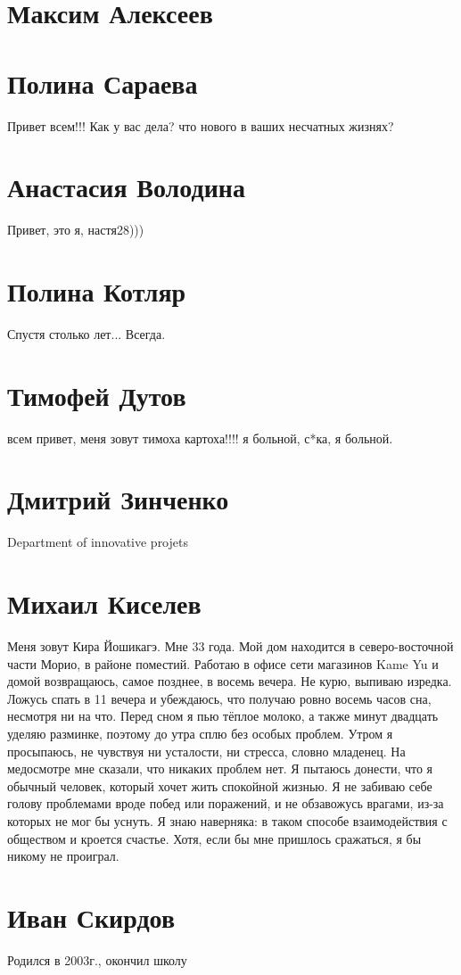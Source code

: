 \documentclass[labwork]{fefudoc}
\begin{document}
\section{Максим Алексеев}
\section{Полина Сараева}

Привет всем!!! Как у вас дела? что нового в ваших несчатных жизнях?

\section{Анастасия Володина}
Привет, это я, настя28))) 
\section{Полина Котляр}

Спустя столько лет...
Всегда.

\section{Тимофей Дутов}

всем привет, меня зовут тимоха картоха!!!!
я больной, с*ка, я больной.


\section{Дмитрий Зинченко}
Department of innovative projets
\section{Михаил Киселев}
Меня зовут Кира Йошикагэ. Мне 33 года. Мой дом находится в северо-восточной части Морио, в районе поместий. Работаю в офисе сети магазинов Kame Yu и домой возвращаюсь, самое позднее, в восемь вечера.
Не курю, выпиваю изредка. Ложусь спать в 11 вечера и убеждаюсь, что получаю ровно восемь часов сна, несмотря ни на что. Перед сном я пью тёплое молоко, а также минут двадцать уделяю разминке, поэтому до утра сплю без особых проблем.
Утром я просыпаюсь, не чувствуя ни усталости, ни стресса, словно младенец. На медосмотре мне сказали, что никаких проблем нет. Я пытаюсь донести, что я обычный человек, который хочет жить спокойной жизнью. Я не забиваю себе голову проблемами вроде побед или поражений, и не обзавожусь врагами, из-за которых не мог бы уснуть. 
Я знаю наверняка: в таком способе взаимодействия с обществом и кроется счастье. Хотя, если бы мне пришлось сражаться, я бы никому не проиграл.
\section{Иван Скирдов}
Родился в 2003г., окончил школу %
\end{document}
